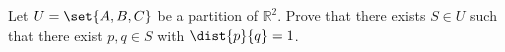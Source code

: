 Let $U = \set{A, B, C}$ be a partition of $\mathbb{R}^2$.
Prove that there exists $S \in U$
such that there exist $p, q \in S$ with $\dist{p}{q} = 1$.
